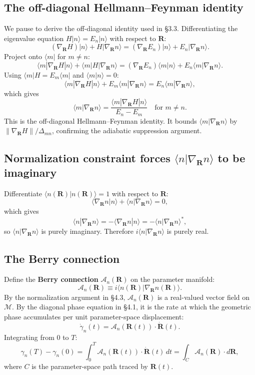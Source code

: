 \documentclass[11pt,a4paper]{article}
\begin{document}
\subsection{The off-diagonal Hellmann--Feynman identity}

We pause to derive the off-diagonal identity used in \S3.3. Differentiating the eigenvalue equation $H|n\rangle = E_n|n\rangle$ with respect to $\mathbf{R}$:
\[
(\nabla_\mathbf{R} H) |n\rangle + H |\nabla_\mathbf{R} n\rangle = (\nabla_\mathbf{R} E_n) |n\rangle + E_n |\nabla_\mathbf{R} n\rangle.
\]
Project onto $\langle m|$ for $m \neq n$:
\[
\langle m|\nabla_\mathbf{R} H|n\rangle + \langle m|H|\nabla_\mathbf{R} n\rangle = (\nabla_\mathbf{R} E_n) \langle m|n\rangle + E_n \langle m|\nabla_\mathbf{R} n\rangle.
\]
Using $\langle m|H = E_m\langle m|$ and $\langle m|n\rangle = 0$:
\[
\langle m|\nabla_\mathbf{R} H|n\rangle + E_m \langle m|\nabla_\mathbf{R} n\rangle = E_n \langle m|\nabla_\mathbf{R} n\rangle,
\]
which gives
\[
\langle m|\nabla_\mathbf{R} n\rangle = \frac{\langle m|\nabla_\mathbf{R} H|n\rangle}{E_n - E_m} \quad \text{for } m \neq n.
\]
This is the off-diagonal Hellmann--Feynman identity. It bounds $\langle m|\nabla_\mathbf{R} n\rangle$ by $\|\nabla_\mathbf{R} H\|/\Delta_{mn}$, confirming the adiabatic suppression argument.

\subsection{Normalization constraint forces $\langle n|\nabla_\mathbf{R} n\rangle$ to be imaginary}

Differentiate $\langle n(\mathbf{R})|n(\mathbf{R})\rangle = 1$ with respect to $\mathbf{R}$:
\[
\langle \nabla_\mathbf{R} n|n\rangle + \langle n|\nabla_\mathbf{R} n\rangle = 0,
\]
which gives
\[
\langle n|\nabla_\mathbf{R} n\rangle = -\langle \nabla_\mathbf{R} n|n\rangle = -\langle n|\nabla_\mathbf{R} n\rangle^{*},
\]
so $\langle n|\nabla_\mathbf{R} n\rangle$ is purely imaginary. Therefore $i\langle n|\nabla_\mathbf{R} n\rangle$ is purely real.

\subsection{The Berry connection}

Define the \textbf{Berry connection} $\mathcal{A}_n(\mathbf{R})$ on the parameter manifold:
\[
\mathcal{A}_n(\mathbf{R}) \equiv i \langle n(\mathbf{R})|\nabla_\mathbf{R} n(\mathbf{R})\rangle.
\]
By the normalization argument in \S4.3, $\mathcal{A}_n(\mathbf{R})$ is a real-valued vector field on $\mathcal{M}$. By the diagonal phase equation in \S4.1, it is the rate at which the geometric phase accumulates per unit parameter-space displacement:
\[
\dot\gamma_n(t) = \mathcal{A}_n(\mathbf{R}(t)) \cdot \dot{\mathbf{R}}(t).
\]
Integrating from $0$ to $T$:
\[
\gamma_n(T) - \gamma_n(0) = \int_0^T \mathcal{A}_n(\mathbf{R}(t)) \cdot \dot{\mathbf{R}}(t) \, dt
= \int_C \mathcal{A}_n(\mathbf{R}) \cdot d\mathbf{R},
\]
where $C$ is the parameter-space path traced by $\mathbf{R}(t)$.
\end{document}
